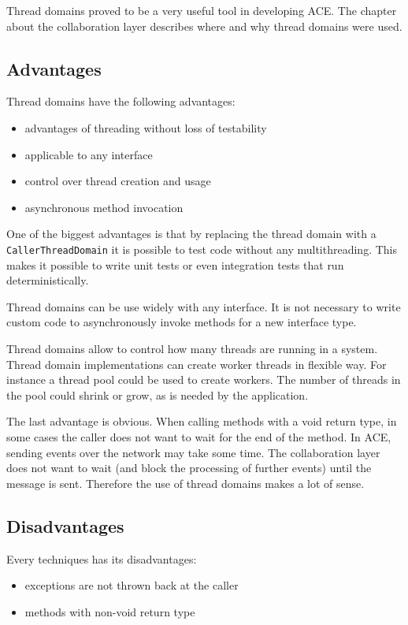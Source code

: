 Thread domains proved to be a very useful tool in developing ACE. The
chapter about the collaboration layer describes where and why thread
domains were used.


\subsection{Advantages}
Thread domains have the following advantages:

\begin{itemize}
 \item advantages of threading without loss of testability
 \item applicable to any interface
 \item control over thread creation and usage
 \item asynchronous method invocation
\end{itemize}

One of the biggest advantages is that by replacing the thread domain with
a \texttt{CallerThreadDomain} it is possible to test code without any
multithreading. This makes it possible to write unit tests or even 
integration tests that run deterministically.

Thread domains can be use widely with any interface. It is not necessary to
write custom code to asynchronously invoke methods for a new interface type.

Thread domains allow to control how many threads are running in a system.
Thread domain implementations can create worker threads in flexible way. For
instance a thread pool could be used to create workers. The number of
threads in the pool could shrink or grow, as is needed by the application.

The last advantage is obvious. When calling methods with a void return type,
in some cases the caller does not want to wait for the end of the method.
In ACE, sending events over the network may take some time. The collaboration
layer does not want to wait (and block the processing of further events)
until the message is sent. Therefore the use of thread domains makes a
lot of sense.


\subsection{Disadvantages}
Every techniques has its disadvantages:

\begin{itemize}
 \item exceptions are not thrown back at the caller
 \item methods with non-void return type
\end{itemize}

